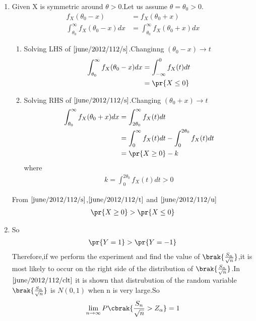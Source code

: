 \begin{enumerate}
    \item Given X is symmetric around $\theta>0$.Let us assume $\theta=\theta_0>0$.
    \begin{align}
        f_X(\theta_0-x)&=f_X(\theta_0+x)\\
        \int_{\theta_0}^{\infty} f_X(\theta_0-x)dx&=
        \int_{\theta_0}^{\infty} f_X(\theta_0+x)dx
        \label{june/2012/112/s}
    \end{align}
    \begin{enumerate}
        \item Solving LHS of $\eqref{june/2012/112/s}$.Changinng $(\theta_0-x) \rightarrow t$
        \begin{align}
           \int_{\theta_0}^{\infty} f_X(\theta_0-x)dx&=
           \int_{-\infty}^{0}f_X(t) dt\\
           &=\pr{X\leq0}\label{june/2012/112/temp}
        \end{align}
        \item Solving RHS of $\eqref{june/2012/112/s}$.Changing $(\theta_0+x) \rightarrow t$
        \begin{align}
           \int_{\theta_0}^{\infty} f_X(\theta_0+x)dx&=
           \int_{2\theta_0}^{\infty} f_X(t)dt\\
          &= \int_{0}^{\infty} f_X(t)dt-\int_{0}^{2\theta_0} f_X(t)dt\\
          &=\pr{X\geq0}-k\label{june/2012/112/u}
        \end{align}
        where
        \begin{align}
           k=\int_{0}^{2\theta_0} f_X(t)dt>0 
        \end{align}
    \end{enumerate}
    From $\eqref{june/2012/112/s}$,$\eqref{june/2012/112/t}$ and $\eqref{june/2012/112/u}$
    \begin{align}
        \pr{X\geq0}>\pr{X\leq0}
    \end{align}
    \item So
    \begin{align}
        \pr{Y=1}>\pr{Y=-1}
    \end{align}
    Therefore,if we perform the experiment and find the value of $\brak{\frac{S_n}{\sqrt{n}}}$,it is most likely to occur on the right side of the distribution of 
$\brak{\frac{S_n}{\sqrt{n}}}$.In $\eqref{june/2012/112/clt}$ it is shown that distrubution of the random variable $\brak{\frac{S_n}{\sqrt{n}}}$
 is $N(0,1)$ when n is very large.So
\begin{align}
    \lim_{n\to\infty}P\cbrak{\frac{S_n}{\sqrt{n}}>Z_\alpha}=1
\end{align}
\end{enumerate}